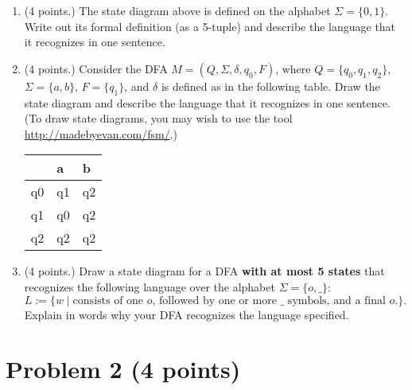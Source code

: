 \documentclass[letterpaper,11pt,twoside]{article}
\theoremstyle{plain}
\theoremstyle{definition}
\theoremstyle{remark}
\theoremstyle{restate}
\begin{document}
\begin{enumerate}
    \item (4 points.) The state diagram above is defined on the alphabet $\Sigma = \{0,1\}$. Write out its formal definition (as a 5-tuple) and describe the language that it recognizes in one sentence.
    
    \item (4 points.) Consider the DFA $M = (Q, \Sigma, \delta, q_0, F)$, where $Q = \{q_0, q_1, q_2\}$, $\Sigma = \{a, b\}$, $F = \{q_1\}$, and $\delta$ is defined as in the following table. Draw the state diagram and describe the language that it recognizes in one sentence. (To draw state diagrams, you may wish to use the tool \url{http://madebyevan.com/fsm/}.)
    
    \begin{table}[h!]
    \centering
    \begin{tabular}{@{}l|ll@{}}
       & a  & b  \\ \midrule
    q0 & q1 & q2 \\
    q1 & q0 & q2 \\
    q2 & q2 & q2
    \end{tabular}
    \end{table}
    
    \item (4 points.) Draw a state diagram for a DFA \textbf{with at most 5 states} that recognizes the following language over the alphabet $\Sigma = \{o, \_\}$: 
    \[
        L := \{w \; | \; \text{consists of one $o$, followed by one or more $\_$ symbols, and a final $o$.}\}.
    \]
    Explain in words why your DFA recognizes the language specified.
 
\end{enumerate}


\clearpage

\section{Problem 2 (4 points)}
\end{document}
